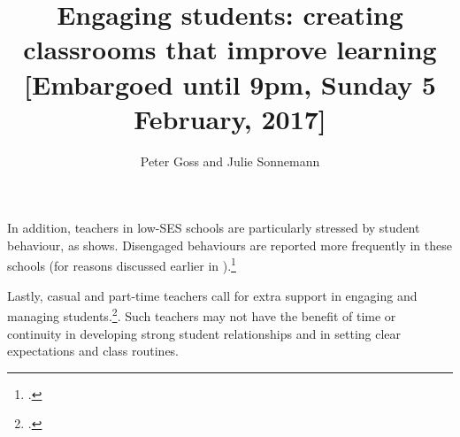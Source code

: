 \documentclass{grattan}
\author{Peter Goss and Julie Sonnemann}
\title{Engaging students: creating classrooms that improve learning [Embargoed until 9pm, Sunday 5 February, 2017]}
\begin{document}
In addition, teachers in low-SES schools are particularly stressed by student behaviour, as  shows. Disengaged behaviours are reported more frequently in these schools (for reasons discussed earlier in ).\footcite{Sullivan2014PunishThemEngage}

Lastly, casual and part-time teachers call for extra support in engaging and managing students.\footcites{Buchanan2013TeacherRetentionAttrition}{TEMAG2016ActionNowClassroom}{Mayer2014LongitudinalTeacherEducation}. Such teachers may not have the benefit of time or continuity in developing strong student relationships and in setting clear expectations and class routines.
\end{document}
